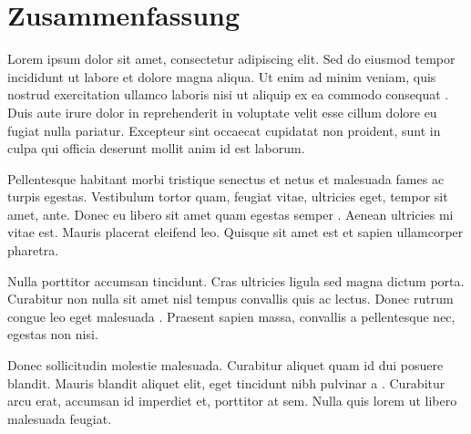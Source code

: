 \chapter{Zusammenfassung}

Lorem ipsum dolor sit amet, consectetur adipiscing elit. Sed do eiusmod tempor incididunt ut labore et dolore magna aliqua. Ut enim ad minim veniam, quis nostrud exercitation ullamco laboris nisi ut aliquip ex ea commodo consequat \cite{DummyBook2024}. Duis aute irure dolor in reprehenderit in voluptate velit esse cillum dolore eu fugiat nulla pariatur. Excepteur sint occaecat cupidatat non proident, sunt in culpa qui officia deserunt mollit anim id est laborum.

Pellentesque habitant morbi tristique senectus et netus et malesuada fames ac turpis egestas. Vestibulum tortor quam, feugiat vitae, ultricies eget, tempor sit amet, ante. Donec eu libero sit amet quam egestas semper \cite{DummyArticle2024}. Aenean ultricies mi vitae est. Mauris placerat eleifend leo. Quisque sit amet est et sapien ullamcorper pharetra.

Nulla porttitor accumsan tincidunt. Cras ultricies ligula sed magna dictum porta. Curabitur non nulla sit amet nisl tempus convallis quis ac lectus. Donec rutrum congue leo eget malesuada \cite{DummyIncollection2024}. Praesent sapien massa, convallis a pellentesque nec, egestas non nisi.

Donec sollicitudin molestie malesuada. Curabitur aliquet quam id dui posuere blandit. Mauris blandit aliquet elit, eget tincidunt nibh pulvinar a \cite{DummyMisc2024}. Curabitur arcu erat, accumsan id imperdiet et, porttitor at sem. Nulla quis lorem ut libero malesuada feugiat.
